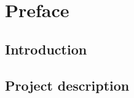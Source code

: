 
\raggedbottom



\frontmatter
 

\cleardoublepage

\cleardoublepage

\chapter*{Preface}


\cleardoublepage

{}
\tableofcontents*

\mainmatter
  

\section{Introduction}


\section{Project description}


\begingroup
 \raggedright
 
\endgroup

\newpage
\listoffixmes

\appendix
\clearforchapter


